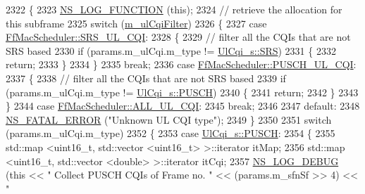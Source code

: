 \begin{DoxyCode}
2322 \{
2323   \hyperlink{log-macros-disabled_8h_a90b90d5bad1f39cb1b64923ea94c0761}{NS\_LOG\_FUNCTION} (\textcolor{keyword}{this});
2324 \textcolor{comment}{// retrieve the allocation for this subframe}
2325   \textcolor{keywordflow}{switch} (\hyperlink{classns3_1_1FfMacScheduler_adae16e66a1c4231da80a1221297442cf}{m\_ulCqiFilter})
2326     \{
2327     \textcolor{keywordflow}{case} \hyperlink{classns3_1_1FfMacScheduler_aa47a9eb25f2c558c825b0be645304a52af2e0df473ba2c8f9cb131cb760591aed}{FfMacScheduler::SRS\_UL\_CQI}:
2328       \{
2329         \textcolor{comment}{// filter all the CQIs that are not SRS based}
2330         \textcolor{keywordflow}{if} (params.m\_ulCqi.m\_type != \hyperlink{structns3_1_1UlCqi__s_aece9e5ebea42eb9ff1744c72c8459b57af4b6dba4243636562c910c4d4761dd7e}{UlCqi\_s::SRS})
2331           \{
2332             \textcolor{keywordflow}{return};
2333           \}
2334       \}
2335       \textcolor{keywordflow}{break};
2336     \textcolor{keywordflow}{case} \hyperlink{classns3_1_1FfMacScheduler_aa47a9eb25f2c558c825b0be645304a52a4a833bc779439b15bd904e1dd8eaa563}{FfMacScheduler::PUSCH\_UL\_CQI}:
2337       \{
2338         \textcolor{comment}{// filter all the CQIs that are not SRS based}
2339         \textcolor{keywordflow}{if} (params.m\_ulCqi.m\_type != \hyperlink{structns3_1_1UlCqi__s_aece9e5ebea42eb9ff1744c72c8459b57a9716b20a3095c473ae3fde1eb5d0bb63}{UlCqi\_s::PUSCH})
2340           \{
2341             \textcolor{keywordflow}{return};
2342           \}
2343       \}
2344     \textcolor{keywordflow}{case} \hyperlink{classns3_1_1FfMacScheduler_aa47a9eb25f2c558c825b0be645304a52a84059a597c72335f0a5963c3efcbda71}{FfMacScheduler::ALL\_UL\_CQI}:
2345       \textcolor{keywordflow}{break};
2346 
2347     \textcolor{keywordflow}{default}:
2348       \hyperlink{group__fatal_ga5131d5e3f75d7d4cbfd706ac456fdc85}{NS\_FATAL\_ERROR} (\textcolor{stringliteral}{"Unknown UL CQI type"});
2349     \}
2350 
2351   \textcolor{keywordflow}{switch} (params.m\_ulCqi.m\_type)
2352     \{
2353     \textcolor{keywordflow}{case} \hyperlink{structns3_1_1UlCqi__s_aece9e5ebea42eb9ff1744c72c8459b57a9716b20a3095c473ae3fde1eb5d0bb63}{UlCqi\_s::PUSCH}:
2354       \{
2355         std::map <uint16\_t, std::vector <uint16\_t> >::iterator itMap;
2356         std::map <uint16\_t, std::vector <double> >::iterator itCqi;
2357         \hyperlink{group__logging_ga413f1886406d49f59a6a0a89b77b4d0a}{NS\_LOG\_DEBUG} (\textcolor{keyword}{this} << \textcolor{stringliteral}{" Collect PUSCH CQIs of Frame no. "} << (params.m\_sfnSf >> 4) << \textcolor{stringliteral}{"
}
\end{DoxyCode}
